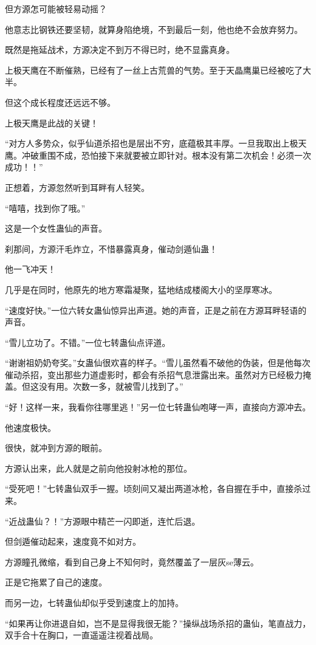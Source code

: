 \begin{this_body}
但方源怎可能被轻易动摇？

他意志比钢铁还要坚韧，就算身陷绝境，不到最后一刻，他也绝不会放弃努力。

既然是拖延战术，方源决定不到万不得已时，绝不显露真身。

上极天鹰在不断催熟，已经有了一丝上古荒兽的气势。至于天晶鹰巢已经被吃了大半。

但这个成长程度还远远不够。

上极天鹰是此战的关键！

“对方人多势众，似乎仙道杀招也是层出不穷，底蕴极其丰厚。一旦我取出上极天鹰。冲破重围不成，恐怕接下来就要被立即针对。根本没有第二次机会！必须一次成功！！”

正想着，方源忽然听到耳畔有人轻笑。

“嘻嘻，找到你了哦。”

这是一个女性蛊仙的声音。

刹那间，方源汗毛炸立，不惜暴露真身，催动剑遁仙蛊！

他一飞冲天！

几乎是在同时，他原先的地方寒霜凝聚，猛地结成楼阁大小的坚厚寒冰。

“速度好快。”一位六转女蛊仙惊异出声道。她的声音，正是之前在方源耳畔轻语的声音。

“雪儿立功了。不错。”一位七转蛊仙点评道。

“谢谢祖奶奶夸奖。”女蛊仙很欢喜的样子。“雪儿虽然看不破他的伪装，但是他每次催动杀招，变出那些力道虚影时，都会有杀招气息泄露出来。虽然对方已经极力掩盖。但这没有用。次数一多，就被雪儿找到了。”

“好！这样一来，我看你往哪里逃！”另一位七转蛊仙咆哮一声，直接向方源冲去。

他速度极快。

很快，就冲到方源的眼前。

方源认出来，此人就是之前向他投射冰枪的那位。

“受死吧！”七转蛊仙双手一握。顷刻间又凝出两道冰枪，各自握在手中，直接杀过来。

“近战蛊仙？！”方源眼中精芒一闪即逝，连忙后退。

但剑遁催动起来，速度竟不如对方。

方源瞳孔微缩，看到自己身上不知何时，竟然覆盖了一层灰se薄云。

正是它拖累了自己的速度。

而另一边，七转蛊仙却似乎受到速度上的加持。

“如果再让你进退自如，岂不是显得我很无能？”操纵战场杀招的蛊仙，笔直战力，双手合十在胸口，一直遥遥注视着战局。


\end{this_body}
